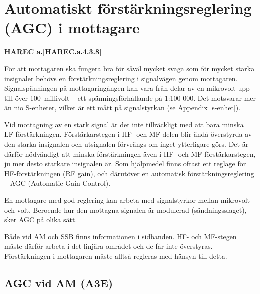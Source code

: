 \section{Automatiskt förstärkningsreglering (AGC) i mottagare}
\textbf{HAREC a.\ref{HAREC.a.4.3.8}\label{myHAREC.a.4.3.8}}

För att mottagaren ska fungera bra för såväl mycket svaga som för
mycket starka insignaler behövs en förstärkningsreglering i
signalvägen genom mottagaren. Signalspänningen på mottagaringången kan
vara från delar av en mikrovolt upp till över 100~millivolt -- ett
spänningsförhållande på 1:100 000. Det motsvarar mer än nio S-enheter,
vilket är ett mått på signalstyrkan (se Appendix \ref{s-enhet}).

Vid mottagning av en stark signal är det inte tillräckligt med att
bara minska LF-förstärkningen. Förstärkarstegen i HF- och MF-delen
blir ändå överstyrda av den starka insignalen och utsignalen förvrängs
om inget ytterligare görs. Det är därför nödvändigt att minska
förstärkningen även i HF- och MF-förstärkarstegen, ju mer desto
starkare insignalen är. Som hjälpmedel finns oftast ett reglage för
HF-förstärkningen (RF gain), och därutöver en automatisk
förstärkningsreglering -- AGC (Automatic Gain Control).

En mottagare med god reglering kan arbeta med signalstyrkor mellan
mikrovolt och volt. Beroende hur den mottagna signalen är modulerad
(sändningsslaget), sker AGC på olika sätt.

Både vid AM och SSB finns informationen i sidbanden. HF- och MF-stegen
måste därför arbeta i det linjära området och de får inte
överstyras. Förstärkningen i mottagaren måste alltså regleras med
hänsyn till detta.

\subsection{AGC vid AM (A3E)}

